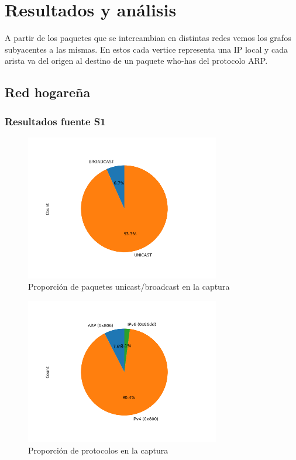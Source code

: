 \section{Resultados y análisis}
A partir de los paquetes que se intercambian en distintas redes vemos los grafos subyacentes a las mismas. En estos cada vertice representa una IP local y cada arista va del origen al destino de un paquete who-has del protocolo ARP.

\subsection*{Red hogareña}
\subsubsection*{Resultados fuente S1}
\begin{figure}[H]
  \centering
  \includegraphics[width=8.5cm]{figs/broadcast_proportion_hogar_ethernet_S1_output.png}
  \caption{\normalfont Proporción de paquetes unicast/broadcast en la captura}
\end{figure}

\begin{figure}[H]
  \centering
  \includegraphics[width=8.5cm]{figs/protocols_proportion_hogar_ethernet_S1_output.png}
  \caption{\normalfont Proporción de protocolos en la captura}
\end{figure}

